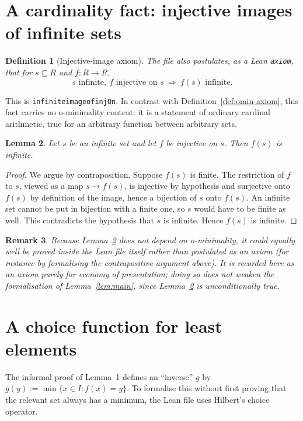 \documentclass[11pt]{article}
\newtheorem{definition}{Definition}[section]
\newtheorem{lemma}[definition]{Lemma}
\newtheorem{remark}[definition]{Remark}
\newcommand{\Lean}[1]{\texttt{\begingroup\def\_{\textunderscore\discretionary{}{}{}}#1\endgroup}}
\begin{document}
\section{A cardinality fact: injective images of infinite sets}
 
\begin{definition}[Injective-image axiom]
The file also postulates, as a Lean \Lean{axiom}, that for $s\subseteq R$ and $f:R\to R$,
\[
  s\text{ infinite},\ f\text{ injective on } s\ \Longrightarrow\ f(s)\text{ infinite}.
\]
\end{definition}
 
This is \Lean{infinite\_image\_of\_injOn}. In contrast with
Definition~\ref{def:omin-axiom}, this fact carries no o-minimality content: it is a statement of
ordinary cardinal arithmetic, true for an arbitrary function between arbitrary sets.
 
\begin{lemma}\label{lem:inj-image}
Let $s$ be an infinite set and let $f$ be injective on $s$. Then $f(s)$ is infinite.
\end{lemma}
 
\begin{proof}
We argue by contraposition. Suppose $f(s)$ is finite. The restriction of $f$ to $s$, viewed as a
map $s\to f(s)$, is injective by hypothesis and surjective onto $f(s)$ by definition of the image,
hence a bijection of $s$ onto $f(s)$. An infinite set cannot be put in bijection with a finite one,
so $s$ would have to be finite as well. This contradicts the hypothesis that $s$ is infinite.
Hence $f(s)$ is infinite.
\end{proof}
 
\begin{remark}
Because Lemma~\ref{lem:inj-image} does not depend on o-minimality, it could equally well be proved
inside the Lean file itself rather than postulated as an axiom (for instance by formalising the
contrapositive argument above). It is recorded here as an axiom purely for economy of
presentation; doing so does not weaken the formalisation of Lemma~\ref{lem:main}, since
Lemma~\ref{lem:inj-image} is unconditionally true.
\end{remark}
 
\section{A choice function for least elements}\label{sec:choice-function}
 
The informal proof of Lemma~1 defines an ``inverse'' $g$ by $g(y):=\min\{x\in I: f(x)=y\}$. To
formalise this without first proving that the relevant set always has a minimum, the Lean file
uses Hilbert's choice operator.
 
\end{document}
